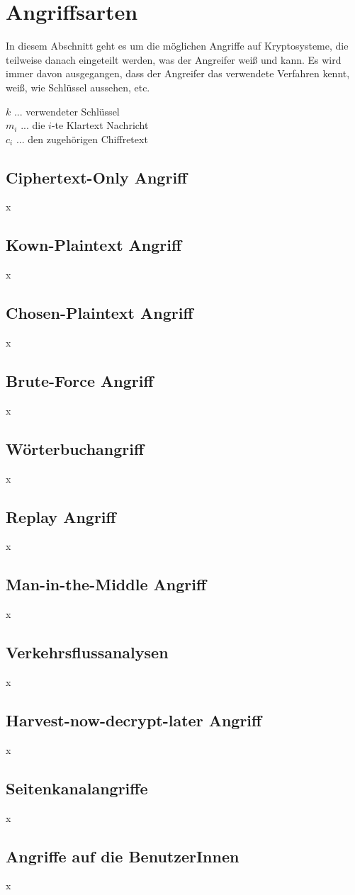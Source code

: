 \section{Angriffsarten}
In diesem Abschnitt geht es um die möglichen Angriffe auf Kryptosysteme, die teilweise danach eingeteilt werden, was der Angreifer weiß und kann. Es wird immer davon ausgegangen, dass der Angreifer das verwendete Verfahren kennt, weiß, wie Schlüssel aussehen, etc.

$k$ ... verwendeter Schlüssel \\
$m_i$ ... die $i$-te Klartext Nachricht \\
$c_i$ ... den zugehörigen Chiffretext

\subsection{Ciphertext-Only Angriff}
x

\subsection{Kown-Plaintext Angriff}
x

\subsection{Chosen-Plaintext Angriff}
x

\subsection{Brute-Force Angriff}
x

\subsection{Wörterbuchangriff}
x

\subsection{Replay Angriff}
x

\subsection{Man-in-the-Middle Angriff}
x

\subsection{Verkehrsflussanalysen}
x

\subsection{Harvest-now-decrypt-later Angriff}
x

\subsection{Seitenkanalangriffe}
x

\subsection{Angriffe auf die BenutzerInnen}
x